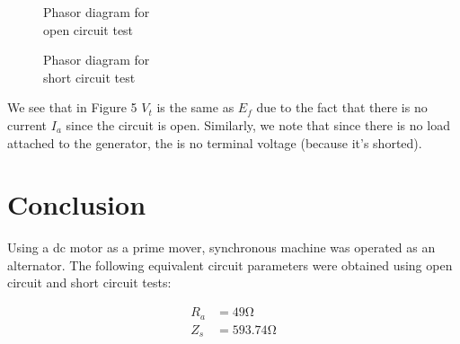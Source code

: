\documentclass{article}
\begin{document}
\begin{figure}[h]
	\begin{minipage}{.5\textwidth}
		\caption{Phasor diagram for\\ open circuit test}
	\end{minipage}
	\begin{minipage}{0.5\textwidth}
		\caption{Phasor diagram for\\ short circuit test}
	\end{minipage}
\end{figure}

We see that in Figure 5 $V_t$ is the same as $E_f$ due to the fact that there is no current $I_a$ since the circuit is open. Similarly, we note that since there is no load attached to the generator, the is no terminal voltage (because it's shorted).

\section{Conclusion}
Using a dc motor as a prime mover, synchronous machine was operated as an alternator. The following equivalent circuit parameters were obtained using open circuit and short circuit tests:

\begin{align*}
	R_a &= 49\si{\ohm}\\
	Z_s &= 593.74\si{\ohm}
\end{align*}
\end{document}
